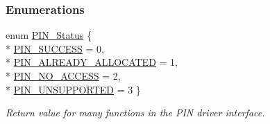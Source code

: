 \subsubsection*{Enumerations}
\begin{DoxyCompactItemize}
\item 
enum \hyperlink{_p_i_n_8h_abe0ad59bbf09e51fe37195a5e70b23f6}{P\-I\-N\-\_\-\-Status} \{ \\*
\hyperlink{_p_i_n_8h_abe0ad59bbf09e51fe37195a5e70b23f6a5c9610fffc152c333036f2c2c7ee54e8}{P\-I\-N\-\_\-\-S\-U\-C\-C\-E\-S\-S} = 0, 
\\*
\hyperlink{_p_i_n_8h_abe0ad59bbf09e51fe37195a5e70b23f6a8280bb6c2bd8ef1fc6f9e24d3d8ed864}{P\-I\-N\-\_\-\-A\-L\-R\-E\-A\-D\-Y\-\_\-\-A\-L\-L\-O\-C\-A\-T\-E\-D} = 1, 
\\*
\hyperlink{_p_i_n_8h_abe0ad59bbf09e51fe37195a5e70b23f6a25bb5dfe42957cfd0922fc1ece880453}{P\-I\-N\-\_\-\-N\-O\-\_\-\-A\-C\-C\-E\-S\-S} = 2, 
\\*
\hyperlink{_p_i_n_8h_abe0ad59bbf09e51fe37195a5e70b23f6a7abd102afc68f4c599c11f8f9c79e7ab}{P\-I\-N\-\_\-\-U\-N\-S\-U\-P\-P\-O\-R\-T\-E\-D} = 3
 \}
\begin{DoxyCompactList}\small\item\em Return value for many functions in the P\-I\-N driver interface. \end{DoxyCompactList}\end{DoxyCompactItemize}
